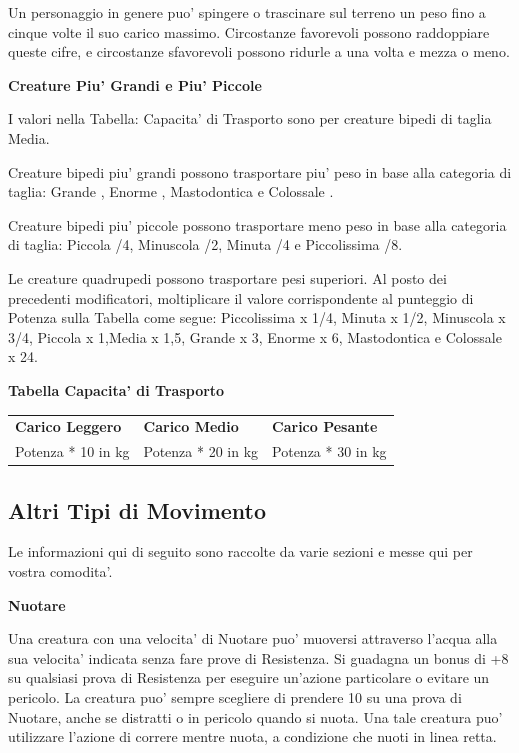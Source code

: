 \documentclass[a4paper,11pt,twoside,openany]{book}
\begin{document}
Un personaggio in genere puo' spingere o trascinare sul terreno un peso fino a cinque volte il suo carico massimo. Circostanze favorevoli possono raddoppiare queste cifre, e circostanze sfavorevoli possono ridurle a una volta e mezza o meno.

\textbf{Creature Piu' Grandi e Piu' Piccole}

I valori nella Tabella: Capacita' di Trasporto sono per creature bipedi di taglia Media.

Creature bipedi piu' grandi possono trasportare piu' peso in base alla categoria di taglia: Grande , Enorme , Mastodontica  e Colossale .

Creature bipedi piu' piccole possono trasportare meno peso in base alla categoria di taglia: Piccola /4, Minuscola /2, Minuta /4 e Piccolissima /8.

Le creature quadrupedi possono trasportare pesi superiori. Al posto dei precedenti modificatori, moltiplicare il valore corrispondente al punteggio di Potenza sulla Tabella come segue: Piccolissima x 1/4, Minuta x 1/2, Minuscola x 3/4, Piccola x 1,Media x 1,5, Grande x 3, Enorme x 6, Mastodontica  e Colossale x 24.


\bigskip

\textbf{Tabella Capacita' di Trasporto}

\begin{tabular}{lll}
\toprule
\textbf{Carico Leggero} & \textbf{Carico Medio} & \textbf{Carico Pesante}\tabularnewline
Potenza {*} 10 in kg & Potenza {*} 20 in kg & Potenza {*} 30 in kg\tabularnewline
\end{tabular}


\subsection{Altri Tipi di Movimento}

\label{altri-tipi-di-movimento}

Le informazioni qui di seguito sono raccolte da varie sezioni e messe
qui per vostra comodita'.

\textbf{Nuotare}

Una creatura con una velocita' di Nuotare puo' muoversi attraverso l'acqua alla sua velocita' indicata senza fare prove di Resistenza. Si guadagna un bonus di +8 su qualsiasi prova di Resistenza per eseguire un'azione particolare o evitare un pericolo. La creatura puo' sempre scegliere di prendere 10 su una prova di Nuotare, anche se distratti o in pericolo quando si nuota. Una tale creatura puo' utilizzare l'azione di correre mentre nuota, a condizione che nuoti in linea retta.
\end{document}
